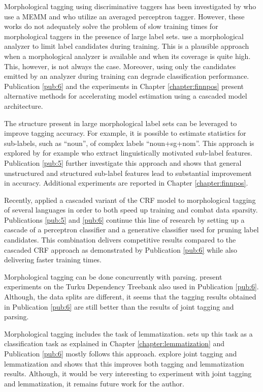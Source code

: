 Morphological tagging using discriminative taggers has been
investigated by \cite{Chrupala2008} who use a MEMM and
\cite{Spoustova2009} who utilize an averaged perceptron
tagger. However, these works do not adequately solve the problem of
slow training times for morphological taggers in the presence of large
label sets. \cite{Spoustova2009} use a morphological analyzer to limit
label candidates during training. This is a plausible approach when a
morphological analyzer is available and when its coverage is quite
high. This, however, is not always the case. Moreover, %
using only the candidates emitted by an analyzer during training can
degrade classification performance. Publication \ref{pub:6} and the
experiments in Chapter \ref{chapter:finnpos} present alternative
methods for accelerating model estimation using a cascaded model
architecture.

The structure present in large morphological label sets can be
leveraged to improve tagging accuracy. For example, it is possible to
estimate statistics for sub-labels, such as ``noun'', of complex
labels ``noun+sg+nom''. This approach is explored by for example
\cite{Spoustova2009} who extract linguistically motivated sub-label
features. Publication \ref{pub:5} further investigate this approach and
shows that general unstructured and structured sub-label features lead
to substantial improvement in accuracy. Additional experiments are
reported in Chapter \ref{chapter:finnpos}.

Recently, \cite{Muller2013} applied a cascaded variant of the CRF
model to morphological tagging of several languages in order to both
speed up training and combat data sparsity. Publications \ref{pub:5} and
\ref{pub:6} continue this line of research by setting up a
cascade of a perceptron classifier and a generative classifier used
for pruning label candidates. This combination delivers competitive
results compared to the cascaded CRF approach as demonstrated by
Publication \ref{pub:6} while also delivering faster training times.

Morphological tagging can be done concurrently with parsing.
\cite{Bohnet2013} present experiments on the Turku Dependency Treebank
also used in Publication \ref{pub:6}. Although, the data splits are
different, it seems that the tagging results obtained in Publication
\ref{pub:6} are still better than the results of joint tagging and
parsing.

Morphological tagging includes the task of
lemmatization. \cite{Chrupala2008} sets up this task as a
classification task as explained in Chapter
\ref{chapter:lemmatization} and Publication \ref{pub:6} mostly follows
this approach. \cite{Muller2015} explore joint tagging and
lemmatization and shows that this improves both tagging and
lemmatization results. Although, it would be very interesting to
experiment with joint tagging and lemmatization, it remains future
work for the author. 


